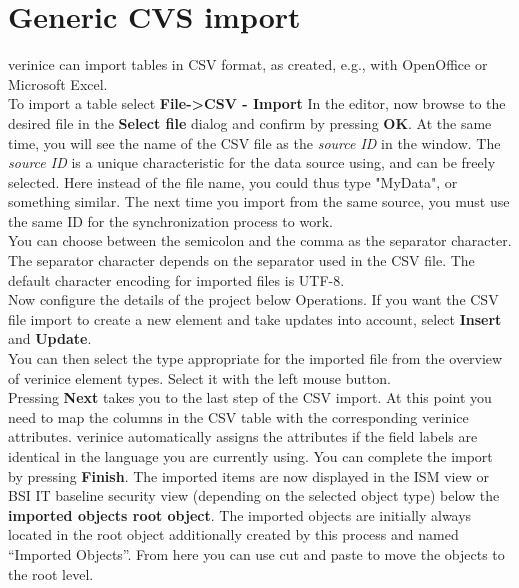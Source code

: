 \documentclass[a4paper,10pt]{book}
\begin{document}
\section{Generic CVS import} \label{sec:generic-csv-import}
verinice can import tables in CSV format, as created, e.g., with OpenOffice or Microsoft Excel.
\newline\\
To import a table select \textbf{File-\textgreater CSV - Import} In the editor, now browse to the desired file in the
\textbf{Select file} dialog and confirm by pressing \textbf{OK}. At the same time, you will see the name of the CSV file as the
\textit{source ID} in the window. The \textit{source ID} is a unique characteristic for the data source using, and can be
freely selected. Here instead of the file name, you could thus type "MyData", or something similar. The next
time you import from the same source, you must use the same ID for the synchronization process to work.
\newline\\
You can choose between the semicolon and the comma as the separator character. The separator character
depends on the separator used in the CSV file. The default character encoding for imported files is UTF-8.
\newline\\
Now configure the details of the project below Operations. If you want the CSV file import to create a new
element and take updates into account, select \textbf{Insert} and \textbf{Update}.
\newline\\
You can then select the type appropriate for the imported file from the overview of verinice element types. Select it with the left mouse button.
\newline\\
Pressing \textbf{Next} takes you to the last step of the CSV import. At this point you need to map the
columns in the CSV table with the corresponding verinice attributes. verinice automatically assigns the
attributes if the field labels are identical in the language you are currently using. You can complete the
import by pressing \textbf{Finish}. The imported items are now displayed in the ISM view or BSI IT baseline
security view (depending on the selected object type) below the \textbf{imported objects root object}.
The imported objects are initially always located in the root object additionally created by this process
and named ``Imported Objects''. From here you can use cut and paste to move the objects to the root level.
\end{document}
